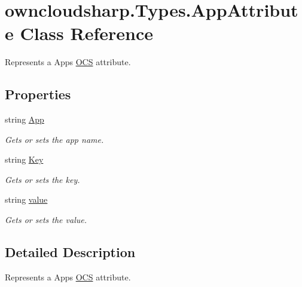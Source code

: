 \hypertarget{classowncloudsharp_1_1_types_1_1_app_attribute}{}\section{owncloudsharp.\+Types.\+App\+Attribute Class Reference}
\label{classowncloudsharp_1_1_types_1_1_app_attribute}


Represents a Apps \hyperlink{classowncloudsharp_1_1_types_1_1_o_c_s}{O\+C\+S} attribute.  


\subsection*{Properties}
\begin{DoxyCompactItemize}
\item 
string \hyperlink{classowncloudsharp_1_1_types_1_1_app_attribute_a3d8aaa71111ab1a2140e02fd2772e938}{App}
\begin{DoxyCompactList}\small\item\em Gets or sets the app name. \end{DoxyCompactList}\item 
string \hyperlink{classowncloudsharp_1_1_types_1_1_app_attribute_a06720302305fa7ae8cb08121fd533d75}{Key}
\begin{DoxyCompactList}\small\item\em Gets or sets the key. \end{DoxyCompactList}\item 
string \hyperlink{classowncloudsharp_1_1_types_1_1_app_attribute_a9bb5cce7716b37c3de9ffceea023e574}{value}
\begin{DoxyCompactList}\small\item\em Gets or sets the value. \end{DoxyCompactList}\end{DoxyCompactItemize}


\subsection{Detailed Description}
Represents a Apps \hyperlink{classowncloudsharp_1_1_types_1_1_o_c_s}{O\+C\+S} attribute. 



